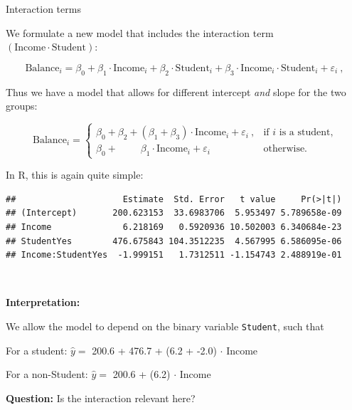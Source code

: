 \documentclass[
  10pt,
  ignorenonframetext,
]{beamer}
\newenvironment{Shaded}{\begin{snugshade}}{\end{snugshade}}
\newcommand{\FunctionTok}[1]{\textcolor[rgb]{0.13,0.29,0.53}{\textbf{#1}}}
\newcommand{\NormalTok}[1]{#1}
\newcommand{\OtherTok}[1]{\textcolor[rgb]{0.56,0.35,0.01}{#1}}
\newcommand{\SpecialCharTok}[1]{\textcolor[rgb]{0.81,0.36,0.00}{\textbf{#1}}}
\begin{document}
\begin{frame}
\begin{block}{Interaction terms}
\protect\hypertarget{interaction-terms}{}
\vspace{2mm}

We formulate a new model that includes the interaction term
\((\text{Income}\cdot \text{Student})\):

\[\text{Balance}_i = \beta_0 + \beta_1 \cdot \text{Income}_i + \beta_2 \cdot \text{Student}_i + \beta_3 \cdot \text{Income}_i \cdot \text{Student}_i  + \varepsilon_i \ ,\]

Thus we have a model that allows for different intercept \emph{and}
slope for the two groups:

\begin{equation*}
\text{Balance}_i = \left\{ 
\begin{array}{ll}
\beta_0 + \beta_2 + (\beta_1 + \beta_3) \cdot \text{Income}_i  + \varepsilon_i \ ,  & \text{if $i$ is a student,}\\
\beta_0 + \qquad \; \beta_1 \cdot \text{Income}_i  + \varepsilon_i  & \text{otherwise.}
\end{array}
\right.
\end{equation*}
\end{block}
\end{frame}

\begin{frame}[fragile]
In R, this is again quite simple:

\scriptsize

\begin{Shaded}
\end{Shaded}

\begin{verbatim}
##                     Estimate  Std. Error   t value     Pr(>|t|)
## (Intercept)       200.623153  33.6983706  5.953497 5.789658e-09
## Income              6.218169   0.5920936 10.502003 6.340684e-23
## StudentYes        476.675843 104.3512235  4.567995 6.586095e-06
## Income:StudentYes  -1.999151   1.7312511 -1.154743 2.488919e-01
\end{verbatim}

\(~\)

\normalsize

\textbf{Interpretation:}

We allow the model to depend on the binary variable \texttt{Student},
such that

For a student: \(\hat{y} =\) 200.6 + 476.7 + (6.2 + -2.0) \(\cdot\)
Income

For a non-Student: \(\hat{y} =\) 200.6 + (6.2) \(\cdot\) Income

\vspace{2mm}

\textbf{Question:} Is the interaction relevant here?
\end{frame}
\end{document}
